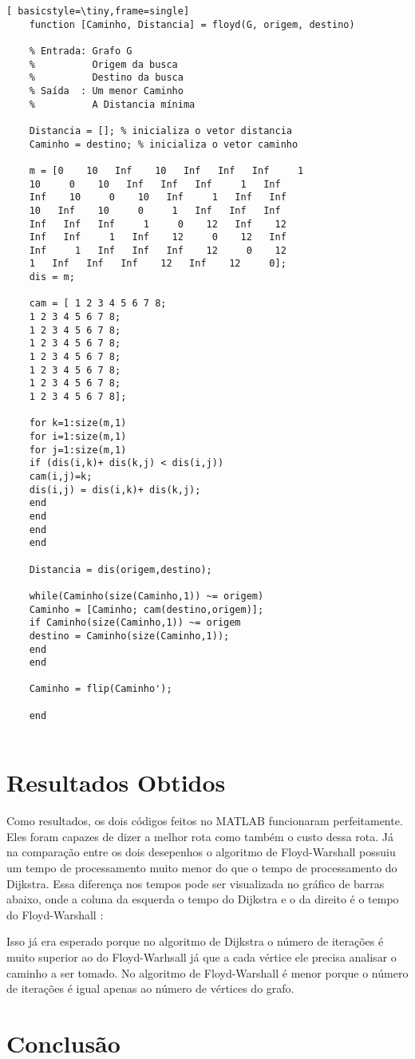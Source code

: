 \documentclass[
12pt,				%
openright,			%
oneside,			%
a4paper,			%
english,			%
french,				%
spanish,			%
brazil,				%
]{abntex2}
\begin{document}
	\begin{lstlisting}[ basicstyle=\tiny,frame=single]
	function [Caminho, Distancia] = floyd(G, origem, destino)
	
	% Entrada: Grafo G
	%          Origem da busca
	%          Destino da busca
	% Saída  : Um menor Caminho
	%          A Distancia mínima
	
	Distancia = []; % inicializa o vetor distancia
	Caminho = destino; % inicializa o vetor caminho
	
	m = [0    10   Inf    10   Inf   Inf   Inf     1
	10     0    10   Inf   Inf   Inf     1   Inf
	Inf    10     0    10   Inf     1   Inf   Inf
	10   Inf    10     0     1   Inf   Inf   Inf
	Inf   Inf   Inf     1     0    12   Inf    12
	Inf   Inf     1   Inf    12     0    12   Inf
	Inf     1   Inf   Inf   Inf    12     0    12
	1   Inf   Inf   Inf    12   Inf    12     0];
	dis = m;
	
	cam = [ 1 2 3 4 5 6 7 8;
	1 2 3 4 5 6 7 8;
	1 2 3 4 5 6 7 8;
	1 2 3 4 5 6 7 8;
	1 2 3 4 5 6 7 8;
	1 2 3 4 5 6 7 8;
	1 2 3 4 5 6 7 8;
	1 2 3 4 5 6 7 8];
	
	for k=1:size(m,1)
	for i=1:size(m,1)
	for j=1:size(m,1)
	if (dis(i,k)+ dis(k,j) < dis(i,j))
	cam(i,j)=k;
	dis(i,j) = dis(i,k)+ dis(k,j);
	end
	end
	end
	end
	
	Distancia = dis(origem,destino);
	
	while(Caminho(size(Caminho,1)) ~= origem)
	Caminho = [Caminho; cam(destino,origem)];
	if Caminho(size(Caminho,1)) ~= origem
	destino = Caminho(size(Caminho,1));
	end
	end
	
	Caminho = flip(Caminho');
	
	end
	
	\end{lstlisting}
	
	\chapter{Resultados Obtidos}
	Como resultados, os dois códigos feitos no MATLAB funcionaram perfeitamente. Eles foram capazes de dizer a melhor rota como também o custo dessa rota. Já na comparação entre os dois desepenhos o algoritmo de Floyd-Warshall possuiu um tempo de processamento muito menor do que o tempo de processamento do Dijkstra. Essa diferença nos tempos pode ser visualizada no gráfico de barras abaixo, onde a coluna da esquerda o tempo do Dijkstra e o da direito é o tempo do Floyd-Warshall :
	
  Isso já era esperado porque no algoritmo de Dijkstra o número de iterações é muito superior ao do Floyd-Warhsall já que a cada vértice ele precisa analisar o caminho a ser tomado. No algoritmo de Floyd-Warshall é menor porque o número de iterações é igual apenas ao número de vértices do grafo.
	\chapter{Conclusão}
	
	
	
\end{document}
